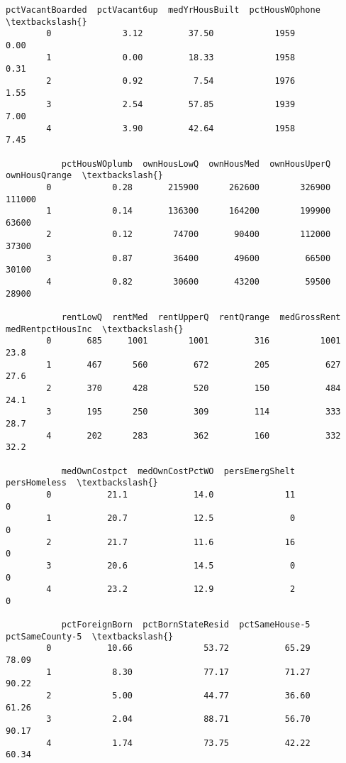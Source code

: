 \documentclass[11pt]{llncs}
\begin{document}
\begin{Verbatim}[commandchars=\\\{\}]
           pctVacantBoarded  pctVacant6up  medYrHousBuilt  pctHousWOphone  \textbackslash{}
        0              3.12         37.50            1959            0.00   
        1              0.00         18.33            1958            0.31   
        2              0.92          7.54            1976            1.55   
        3              2.54         57.85            1939            7.00   
        4              3.90         42.64            1958            7.45   
        
           pctHousWOplumb  ownHousLowQ  ownHousMed  ownHousUperQ  ownHousQrange  \textbackslash{}
        0            0.28       215900      262600        326900         111000   
        1            0.14       136300      164200        199900          63600   
        2            0.12        74700       90400        112000          37300   
        3            0.87        36400       49600         66500          30100   
        4            0.82        30600       43200         59500          28900   
        
           rentLowQ  rentMed  rentUpperQ  rentQrange  medGrossRent  medRentpctHousInc  \textbackslash{}
        0       685     1001        1001         316          1001               23.8   
        1       467      560         672         205           627               27.6   
        2       370      428         520         150           484               24.1   
        3       195      250         309         114           333               28.7   
        4       202      283         362         160           332               32.2   
        
           medOwnCostpct  medOwnCostPctWO  persEmergShelt  persHomeless  \textbackslash{}
        0           21.1             14.0              11             0   
        1           20.7             12.5               0             0   
        2           21.7             11.6              16             0   
        3           20.6             14.5               0             0   
        4           23.2             12.9               2             0   
        
           pctForeignBorn  pctBornStateResid  pctSameHouse-5  pctSameCounty-5  \textbackslash{}
        0           10.66              53.72           65.29            78.09   
        1            8.30              77.17           71.27            90.22   
        2            5.00              44.77           36.60            61.26   
        3            2.04              88.71           56.70            90.17   
        4            1.74              73.75           42.22            60.34   
        

\end{Verbatim}
\end{document}
